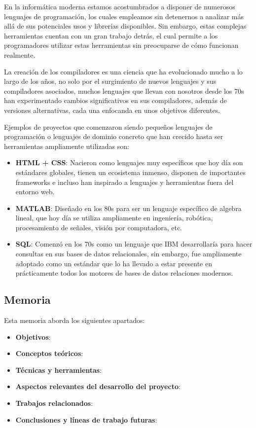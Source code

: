 En la informática moderna estamos acostumbrados a disponer de numerosos lenguajes de programación, los cuales empleamos sin detenernos a analizar más allá de sus potenciales usos y librerías disponibles. Sin embargo, estas complejas herramientas cuentan con un gran trabajo detrás, el cual permite a los programadores utilizar estas herramientas sin preocuparse de cómo funcionan realmente.

La creación de los compiladores es una ciencia que ha evolucionado mucho a lo largo de los años, no solo por el surgimiento de nuevos lenguajes y sus compiladores asociados, muchos lenguajes que llevan con nosotros desde los 70s han experimentado cambios significativos en sus compiladores, además de versiones alternativas, cada una enfocanda en unos objetivos diferentes.

Ejemplos de proyectos que comenzaron siendo pequeños lenguajes de programación o lenguajes de dominio concreto que han crecido hasta ser herramientas ampliamente utilizadas son: 
\begin{itemize}
    \item \textbf{HTML + CSS}: Nacieron como lenguajes muy específicos que hoy día son estándares globales, tienen un ecosistema inmenso, disponen de importantes frameworks e incluso han inspirado a lenguajes y herramientas fuera del entorno web.
    \item \textbf{MATLAB}: Diseñado en los 80s para ser un lenguaje específico de algebra lineal, que hoy día se utiliza ampliamente en ingeniería, robótica, procesamiento de señales, visión por computadora, etc.  
    \item \textbf{SQL}: Comenzó en los 70s como un lenguaje que IBM desarrollaría para hacer consultas en sus bases de datos relacionales, sin embargo, fue ampliamente adoptado como un estándar que lo ha llevado a estar presente en prácticamente todos los motores de bases de datos relaciones modernos. 
\end{itemize}

\subsection{Memoria}
Esta memoria aborda los siguientes apartados:
\begin{itemize}
    \item \textbf{Objetivos}:
    \item \textbf{Conceptos teóricos}:
    \item \textbf{Técnicas y herramientas}:
    \item \textbf{Aspectos relevantes del desarrollo del proyecto}:
    \item \textbf{Trabajos relacionados}:
    \item \textbf{Conclusiones y líneas de trabajo futuras}:
\end{itemize}

